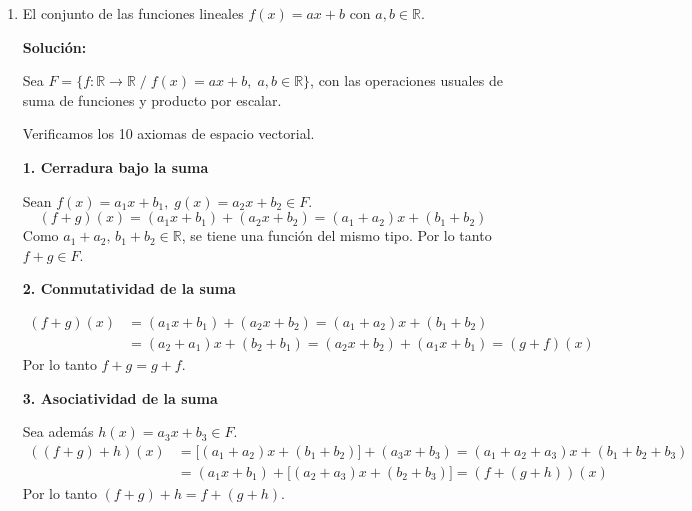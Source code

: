 \documentclass[12pt]{article}
\newcommand{\solucion}{%
    \vspace{0.8em}%
    \textbf{Solución:}%
    \vspace{0.8em}%
}
\begin{document}
\begin{enumerate}[label=\alph*.-]
    \textbf{10. Existencia del elemento neutro del producto}

    \[
    1\cdot M_1 = 1\cdot\begin{pmatrix}0 & a_1\\ -a_1 & 0\end{pmatrix} = \begin{pmatrix}0 & a_1\\ -a_1 & 0\end{pmatrix} = M_1
    \]
    Por lo tanto existe $1\in\mathbb{R}$ tal que $1\cdot M_1=M_1$.

    \textbf{Conclusión:}

    Como se cumplen los 10 axiomas, $A$ (el conjunto de matrices de orden 2 antisimétricas) \textbf{es un espacio vectorial} con las operaciones usuales.

    \item El conjunto de las funciones lineales $f(x)=ax+b$ con $a,b \in \mathbb{R}$.

    \solucion

    Sea $F=\{f:\mathbb{R}\to\mathbb{R} \; / \; f(x)=ax+b,\; a,b\in\mathbb{R}\}$, con las operaciones usuales de suma de funciones y producto por escalar.

    Verificamos los 10 axiomas de espacio vectorial.

    \textbf{1. Cerradura bajo la suma}

    Sean $f(x)=a_1x+b_1,\; g(x)=a_2x+b_2 \in F$.
    \[
    (f+g)(x) = (a_1x+b_1)+(a_2x+b_2) = (a_1+a_2)x+(b_1+b_2)
    \]
    Como $a_1+a_2,\, b_1+b_2 \in \mathbb{R}$, se tiene una función del mismo tipo. Por lo tanto $f+g \in F$.

    \textbf{2. Conmutatividad de la suma}

    \begin{align*}
    (f+g)(x) &= (a_1x+b_1)+(a_2x+b_2) = (a_1+a_2)x+(b_1+b_2)\\
    &= (a_2+a_1)x+(b_2+b_1) = (a_2x+b_2)+(a_1x+b_1) = (g+f)(x)
    \end{align*}
    Por lo tanto $f+g=g+f$.

    \textbf{3. Asociatividad de la suma}

    Sea además $h(x)=a_3x+b_3 \in F$.
    \begin{align*}
    ((f+g)+h)(x) &= \big[(a_1+a_2)x+(b_1+b_2)\big]+(a_3x+b_3) = (a_1+a_2+a_3)x+(b_1+b_2+b_3)\\
    &= (a_1x+b_1)+\big[(a_2+a_3)x+(b_2+b_3)\big] = (f+(g+h))(x)
    \end{align*}
    Por lo tanto $(f+g)+h=f+(g+h)$.


\end{enumerate}
\end{document}
